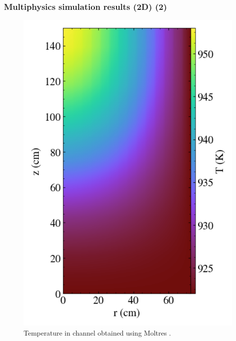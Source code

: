 \begin{frame}
  \frametitle{Multiphysics simulation results (2D) (2)}
  \begin{figure}[t]
   \vspace{-0.05in}
   \hspace*{-0.15in}
   \includegraphics[height=0.85\textheight]{./images/moltres_temp.png}
   \vspace{-0.1in}
   \caption{Temperature in channel obtained using Moltres \cite{lindsay_introduction_2018}.}
    \end{figure}

\end{frame}

